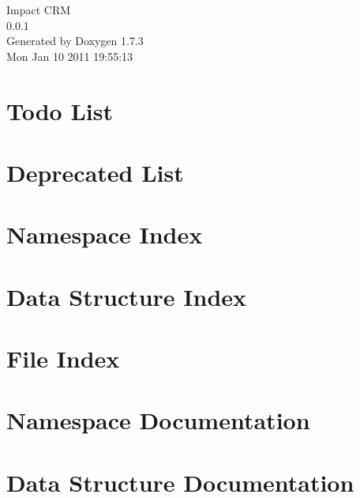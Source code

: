 \documentclass[a4paper]{book}
\begin{document}
\hypersetup{pageanchor=false}
\begin{titlepage}
\vspace*{7cm}
\begin{center}
{\Large Impact CRM \\[1ex]\large 0.0.1 }\\
\vspace*{1cm}
{\large Generated by Doxygen 1.7.3}\\
\vspace*{0.5cm}
{\small Mon Jan 10 2011 19:55:13}\\
\end{center}
\end{titlepage}
\clearemptydoublepage
{}
\tableofcontents
\clearemptydoublepage
{}
\hypersetup{pageanchor=true}
\chapter{Todo List}
\label{todo}
\hypertarget{todo}{}

\chapter{Deprecated List}
\label{deprecated}
\hypertarget{deprecated}{}

\chapter{Namespace Index}

\chapter{Data Structure Index}

\chapter{File Index}

\chapter{Namespace Documentation}




\chapter{Data Structure Documentation}











\end{document}
